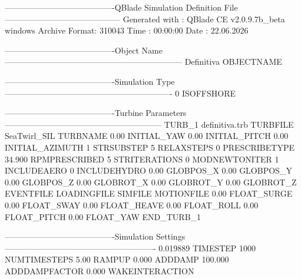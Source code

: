 \begin{cfgcode}
----------------------------------------QBlade Simulation Definition File------------------------------------------
Generated with : QBlade CE v2.0.9.7b_beta windows
Archive Format: 310043
Time : 00:00:00
Date : 22.06.2026

----------------------------------------Object Name-----------------------------------------------------------------
Definitiva                               OBJECTNAME

----------------------------------------Simulation Type-------------------------------------------------------------
0                                        ISOFFSHORE

----------------------------------------Turbine Parameters---------------------------------------------------------
TURB_1
    definitiva.trb             TURBFILE
    SeaTwirl_SIL                          TURBNAME
    0.00                                 INITIAL_YAW
    0.00                                 INITIAL_PITCH
    0.00                                 INITIAL_AZIMUTH
     1                                    STRSUBSTEP
     5                                    RELAXSTEPS
    0                                    PRESCRIBETYPE
    34.900                               RPMPRESCRIBED
    5                                    STRITERATIONS
    0                                    MODNEWTONITER
    1                                    INCLUDEAERO
     0                                    INCLUDEHYDRO
    0.00                                 GLOBPOS_X
    0.00                                 GLOBPOS_Y
    0.00                                 GLOBPOS_Z
    0.00                                 GLOBROT_X
    0.00                                 GLOBROT_Y
    0.00                                 GLOBROT_Z
                                         EVENTFILE
                                         LOADINGFILE
                                         SIMFILE
                                         MOTIONFILE
    0.00                                 FLOAT_SURGE
    0.00                                 FLOAT_SWAY
    0.00                                 FLOAT_HEAVE
    0.00                                 FLOAT_ROLL
    0.00                                 FLOAT_PITCH
    0.00                                 FLOAT_YAW
END_TURB_1

----------------------------------------Simulation Settings-------------------------------------------------------
0.019889                               TIMESTEP
1000                                   NUMTIMESTEPS
5.00                                   RAMPUP
0.000                                  ADDDAMP
100.000                                ADDDAMPFACTOR
0.000                                  WAKEINTERACTION


\end{cfgcode}
